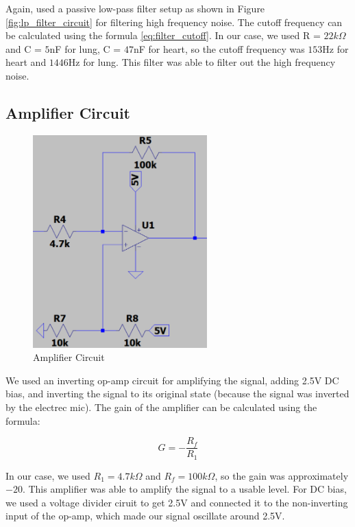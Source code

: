 Again, used a passive low-pass filter setup as shown in Figure \ref{fig:lp_filter_circuit} for filtering high frequency noise. The cutoff frequency can be calculated using the formula \ref{eq:filter_cutoff}. In our case, we used R = $22k\Omega$ and C = $5$nF for lung, C = $47$nF for heart, so the cutoff frequency was $153$Hz for heart and $1446$Hz for lung. This filter was able to filter out the high frequency noise. 

\newpage
\thispagestyle{plain}

\subsection{Amplifier Circuit}

\begin{figure}[h]
    \centering
    \includegraphics[width=0.6\textwidth]{assets/amplifier.png}
    \caption{Amplifier Circuit}
    \label{fig:amplifier_circuit}
\end{figure}

We used an inverting op-amp circuit for amplifying the signal, adding 2.5V DC bias, and inverting the signal to its original state (because the signal was inverted by the electrec mic). The gain of the amplifier can be calculated using the formula:

\begin{equation}\label{eq:amplifier_gain}
    G = -\frac{R_f}{R_1}
\end{equation}

In our case, we used $R_1 = 4.7k\Omega$ and $R_f = 100k\Omega$, so the gain was approximately $-20$. This amplifier was able to amplify the signal to a usable level. For DC bias, we used a voltage divider ciruit to get 2.5V and connected it to the non-inverting input of the op-amp, which made our signal oscillate around 2.5V.

